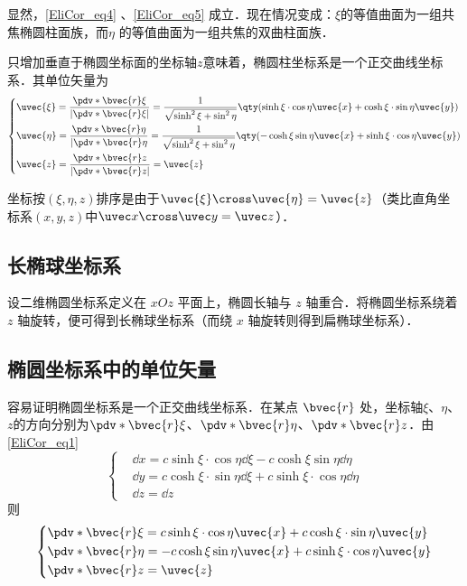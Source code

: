 显然，\autoref{EliCor_eq4} 、\autoref{EliCor_eq5} 成立．现在情况变成：$\xi$的等值曲面为一组共焦椭圆柱面族，而$\eta$ 的等值曲面为一组共焦的双曲柱面族．

只增加垂直于椭圆坐标面的坐标轴$z$意味着，椭圆柱坐标系是一个正交曲线坐标系．其单位矢量为
\begin{equation}
\left\{
    \begin{aligned}
    &\uvec{\xi}=\frac{\pdv*{\bvec{r}}{\xi}}{|\pdv*{\bvec{r}}{\xi}|}=\frac{1}{\sqrt{\sinh^2\xi+\sin^2\eta}}\qty(\sinh\xi\cdot\cos\eta\uvec{x}+\cosh\xi\cdot\sin\eta\uvec{y})\\
    &\uvec{\eta }=\frac{\pdv*{\bvec{r}}{\eta}}{|\pdv*{\bvec{r}}{\eta}}=\frac{1}{\sqrt{\sinh^2\xi+\sin^2\eta}}\qty(-\cosh\xi\sin\eta\uvec{x}+\sinh\xi\cdot\cos\eta\uvec{y})\\
    &\uvec{z}=\frac{\pdv*{\bvec{r}}{z}}{|\pdv*{\bvec{r}}{z}|}=\uvec{z}
    \end{aligned}\right.
\end{equation}

坐标按$(\xi,\eta,z)$排序是由于$\uvec{\xi}\cross\uvec{\eta}=\uvec{z}$（类比直角坐标系$(x,y,z)$中$\uvec x\cross\uvec y=\uvec z$）．
\subsection{长椭球坐标系}
设二维椭圆坐标系定义在 $xOz$ 平面上，椭圆长轴与 $z$ 轴重合．将椭圆坐标系绕着 $z$ 轴旋转，便可得到长椭球坐标系（而绕 $x$ 轴旋转则得到扁椭球坐标系）．

\subsection{椭圆坐标系中的单位矢量}
容易证明椭圆坐标系是一个正交曲线坐标系．在某点 $\bvec{r}$ 处，坐标轴$\xi$、$\eta$、$z$的方向分别为$\pdv*{\bvec{r}}{\xi}$、$\pdv*{\bvec{r}}{\eta}$、$\pdv*{\bvec{r}}{z}$．由\autoref{EliCor_eq1} 
\begin{equation}\label{EliCor_eq2}
\left\{
    \begin{aligned}
    &\dd x=c\sinh\xi\cdot\cos\eta\dd\xi-c\cosh\xi\sin\eta\dd\eta\\
    &\dd y=c\cosh\xi\cdot\sin\eta\dd\xi+c\sinh\xi\cdot\cos\eta\dd\eta\\
    &\dd z=\dd z
    \end{aligned}\right.
\end{equation}
则
\begin{equation}
\left\{
    \begin{aligned}
&\pdv*{\bvec{r}}{\xi}=c\sinh\xi\cdot\cos\eta\uvec{x}+c\cosh\xi\cdot\sin\eta\uvec{y}\\
&\pdv*{\bvec{r}}{\eta}=-c\cosh\xi\sin\eta\uvec{x}+c\sinh\xi\cdot\cos\eta\uvec{y}\\
&\pdv*{\bvec{r}}{z}=\uvec{z}
    \end{aligned}\right.
\end{equation}

